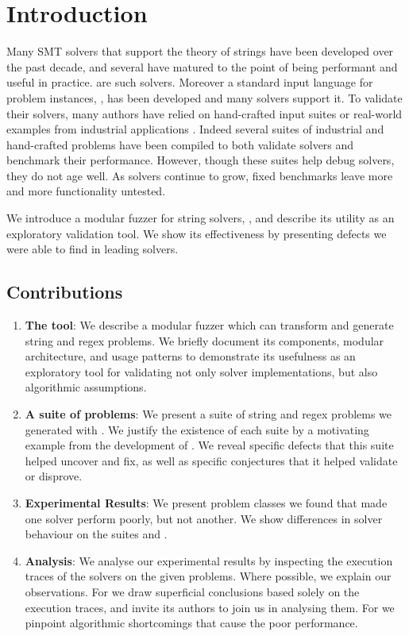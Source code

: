 \section{Introduction}

    Many SMT solvers that support the theory of strings have been developed over the past decade, and several have matured to the point of being performant and useful in practice. \theSolvers{}\cite{cvc4}\cite{z3str3} are \numSolvers{} such solvers. Moreover a standard input language for problem instances, \smt{}\cite{smt}, has been developed and many solvers support it. To validate their solvers, many authors have relied on hand-crafted input suites or real-world examples from industrial applications \cite{cvc4-tests} \cite{z3str3-tests} \cite{z3str2-tests}. Indeed several suites of industrial and hand-crafted problems have been compiled \cite{kaluza} \cite{kausler} to both validate solvers and benchmark their performance. However, though these suites help debug solvers, they do not age well. As solvers continue to grow, fixed benchmarks leave more and more functionality untested.

    We introduce a modular fuzzer for string solvers, \fuzzer{}, and describe its utility as an exploratory validation tool. We show its effectiveness by presenting defects we were able to find in leading solvers.

    \subsection{Contributions}

    \begin{enumerate}
        \item \textbf{The \fuzzer{} tool}: We describe a modular fuzzer which can transform and generate \smt{} string and regex problems. We briefly document its components, modular architecture, and usage patterns to demonstrate its usefulness as an exploratory tool for validating not only solver implementations, but also algorithmic assumptions.
        \item \textbf{A suite of \smt{} problems}: We present a suite of \smt{} string and regex problems we generated with \fuzzer{}. We justify the existence of each suite by a motivating example from the development of \us{}. We reveal specific defects that this suite helped uncover and fix, as well as specific conjectures that it helped validate or disprove.
        \item \textbf{Experimental Results}: We present problem classes we found that made one solver perform poorly, but not another. We show differences in solver behaviour on the suites \cHard{} and \zHard{}.
        \item \textbf{Analysis}: We analyse our experimental results by inspecting the execution traces of the solvers on the given problems. Where possible, we explain our observations. For \cvc{} we draw superficial conclusions based solely on the execution traces, and invite its authors to join us in analysing them. For \us{} we pinpoint algorithmic shortcomings that cause the poor performance.
    \end{enumerate}
